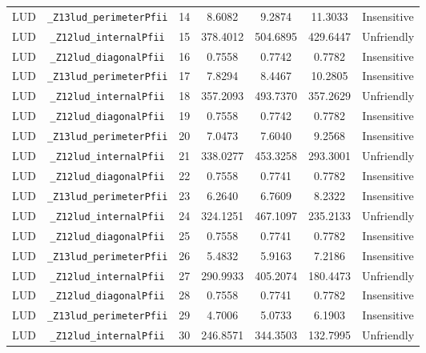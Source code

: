 \documentclass{article}
\begin{document}
\begin{table}[H]
\begin{tabular}{c c c c c c c}
		LUD       & \verb|_Z13lud_perimeterPfii|         & 14  & 8.6082   & 9.2874        & 11.3033        & Insensitive \\
		LUD       & \verb|_Z12lud_internalPfii|          & 15  & 378.4012 & 504.6895      & 429.6447       & Unfriendly  \\
		LUD       & \verb|_Z12lud_diagonalPfii|          & 16  & 0.7558   & 0.7742        & 0.7782         & Insensitive \\
		LUD       & \verb|_Z13lud_perimeterPfii|         & 17  & 7.8294   & 8.4467        & 10.2805        & Insensitive \\
		LUD       & \verb|_Z12lud_internalPfii|          & 18  & 357.2093 & 493.7370      & 357.2629       & Unfriendly  \\
		LUD       & \verb|_Z12lud_diagonalPfii|          & 19  & 0.7558   & 0.7742        & 0.7782         & Insensitive \\
		LUD       & \verb|_Z13lud_perimeterPfii|         & 20  & 7.0473   & 7.6040        & 9.2568         & Insensitive \\
		LUD       & \verb|_Z12lud_internalPfii|          & 21  & 338.0277 & 453.3258      & 293.3001       & Unfriendly  \\
		LUD       & \verb|_Z12lud_diagonalPfii|          & 22  & 0.7558   & 0.7741        & 0.7782         & Insensitive \\
		LUD       & \verb|_Z13lud_perimeterPfii|         & 23  & 6.2640   & 6.7609        & 8.2322         & Insensitive \\
		LUD       & \verb|_Z12lud_internalPfii|          & 24  & 324.1251 & 467.1097      & 235.2133       & Unfriendly  \\
		LUD       & \verb|_Z12lud_diagonalPfii|          & 25  & 0.7558   & 0.7741        & 0.7782         & Insensitive \\
		LUD       & \verb|_Z13lud_perimeterPfii|         & 26  & 5.4832   & 5.9163        & 7.2186         & Insensitive \\
		LUD       & \verb|_Z12lud_internalPfii|          & 27  & 290.9933 & 405.2074      & 180.4473       & Unfriendly  \\
		LUD       & \verb|_Z12lud_diagonalPfii|          & 28  & 0.7558   & 0.7741        & 0.7782         & Insensitive \\
		LUD       & \verb|_Z13lud_perimeterPfii|         & 29  & 4.7006   & 5.0733        & 6.1903         & Insensitive \\
		LUD       & \verb|_Z12lud_internalPfii|          & 30  & 246.8571 & 344.3503      & 132.7995       & Unfriendly  \\

\end{tabular}
\end{table}
\end{document}
